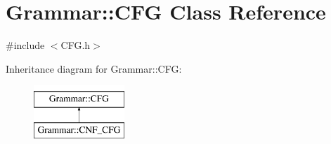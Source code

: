 \hypertarget{classGrammar_1_1CFG}{\section{\-Grammar\-:\-:\-C\-F\-G \-Class \-Reference}
\label{dd/dc1/classGrammar_1_1CFG}
}


{\ttfamily \#include $<$\-C\-F\-G.\-h$>$}

\-Inheritance diagram for \-Grammar\-:\-:\-C\-F\-G\-:\begin{figure}[H]
\begin{center}
\leavevmode
\includegraphics[height=2.000000cm]{dd/dc1/classGrammar_1_1CFG}
\end{center}
\end{figure}
